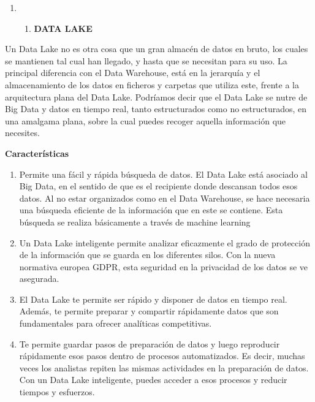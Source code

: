 \documentclass{article} %
\begin{document}
\noindent 

\noindent 

\begin{enumerate}
\item \begin{enumerate}
\item  \textbf{DATA LAKE}
\end{enumerate}
\end{enumerate}

\noindent \textbf{}

\noindent Un Data Lake no es otra cosa que un gran almac\'{e}n de datos en bruto, los cuales se mantienen tal cual han llegado, y hasta que se necesitan para su uso. La principal diferencia con el Data Warehouse, est\'{a} en la jerarqu\'{i}a y el almacenamiento de los datos en ficheros y carpetas que utiliza este, frente a la arquitectura plana del Data Lake. Podr\'{i}amos decir que el Data Lake se nutre de Big Data y datos en tiempo real, tanto estructurados como no estructurados, en una amalgama plana, sobre la cual puedes recoger aquella informaci\'{o}n que necesites.

\noindent \textbf{}

\noindent \textbf{Caracter\'{i}sticas}

\noindent \textbf{}

\begin{enumerate}
\item \textbf{ }Permite una f\'{a}cil y r\'{a}pida b\'{u}squeda de datos. El Data Lake est\'{a} asociado al Big Data, en el sentido de que es el recipiente donde descansan todos esos datos. Al no estar organizados como en el Data Warehouse, se hace necesaria una b\'{u}squeda eficiente de la informaci\'{o}n que en este se contiene. Esta b\'{u}squeda se realiza b\'{a}sicamente a trav\'{e}s de machine learning

\item  Un Data Lake inteligente permite analizar eficazmente el grado de protecci\'{o}n de la informaci\'{o}n que se guarda en los diferentes silos. Con la nueva normativa europea GDPR, esta seguridad en la privacidad de los datos se ve asegurada.

\item  El Data Lake te permite ser r\'{a}pido y disponer de datos en tiempo real. Adem\'{a}s, te permite preparar y compartir r\'{a}pidamente datos que son fundamentales para ofrecer anal\'{i}ticas competitivas.

\item  Te permite guardar pasos de preparaci\'{o}n de datos y luego reproducir r\'{a}pidamente esos pasos dentro de procesos automatizados. Es decir, muchas veces los analistas repiten las mismas actividades en la preparaci\'{o}n de datos. Con un Data Lake inteligente, puedes acceder a esos procesos y reducir tiempos y esfuerzos.
\end{enumerate}
\end{document}
